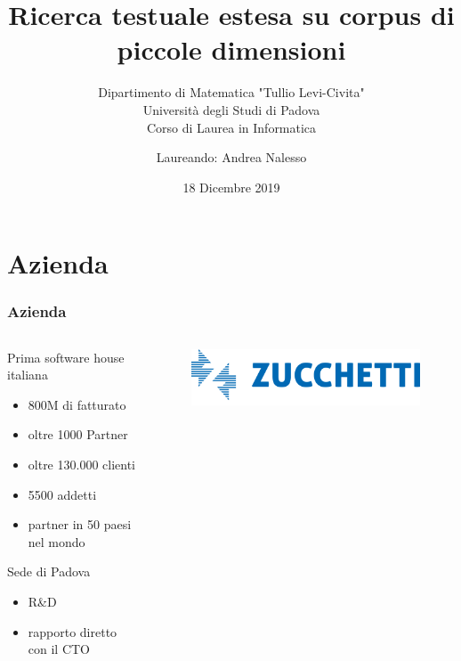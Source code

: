 \documentclass{beamer}
\title{Ricerca testuale estesa su corpus di piccole dimensioni}
\subtitle{Dipartimento di Matematica "Tullio Levi-Civita" \\ Università degli Studi di Padova \\ Corso di Laurea in Informatica}
\author{Laureando: Andrea Nalesso}
\date{18 Dicembre 2019}
\begin{document}
	\maketitle


	\section{Azienda}
	\begin{frame}
		\frametitle{Azienda}
	  \begin{columns}
		\begin{column}{0.5\textwidth}
		   Prima software house italiana
		   \begin{itemize}
			\item 800M di fatturato
			\item oltre 1000 Partner
			\item oltre 130.000 clienti
			\item 5500 addetti
			\item partner in 50 paesi nel mondo
		   \end{itemize}
		   \vspace*{1em}
		   \hspace*{1em}Sede di Padova
		   \begin{itemize}
			   \item R\&D
			   \item rapporto diretto con il CTO
		   \end{itemize}
		\end{column}
		\begin{column}{0.5\textwidth}  %
			\vspace{-11	em}
			
			\begin{figure}
				\centering
				\includegraphics[width=\textwidth]{img/logo_azienda.png}
			\end{figure}
			 
		\end{column}
	  \end{columns}
	\end{frame}
\end{document}
